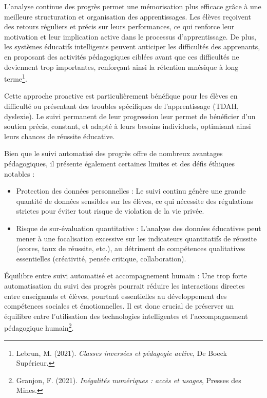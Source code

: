 \documentclass[11pt,a4paper]{report}
\begin{document}
L’analyse continue des progrès permet une mémorisation plus efficace grâce à une meilleure structuration et organisation des apprentissages. Les élèves reçoivent des retours réguliers et précis sur leurs performances, ce qui renforce leur motivation et leur implication active dans le processus d’apprentissage. De plus, les systèmes éducatifs intelligents peuvent anticiper les difficultés des apprenants, en proposant des activités pédagogiques ciblées avant que ces difficultés ne deviennent trop importantes, renforçant ainsi la rétention mnésique à long terme\footnote{Lebrun, M. (2021). \textit{Classes inversées et pédagogie active}, De Boeck Supérieur.}.

Cette approche proactive est particulièrement bénéfique pour les élèves en difficulté ou présentant des troubles spécifiques de l’apprentissage (TDAH, dyslexie). Le suivi permanent de leur progression leur permet de bénéficier d’un soutien précis, constant, et adapté à leurs besoins individuels, optimisant ainsi leurs chances de réussite éducative.

Bien que le suivi automatisé des progrès offre de nombreux avantages pédagogiques, il présente également certaines limites et des défis éthiques notables :

\begin{itemize}

    \item Protection des données personnelles : Le suivi continu génère une grande quantité de données sensibles sur les élèves, ce qui nécessite des régulations strictes pour éviter tout risque de violation de la vie privée.

    \item Risque de sur-évaluation quantitative : L’analyse des données éducatives peut mener à une focalisation excessive sur les indicateurs quantitatifs de réussite (scores, taux de réussite, etc.), au détriment de compétences qualitatives essentielles (créativité, pensée critique, collaboration).
 
\end{itemize}

Équilibre entre suivi automatisé et accompagnement humain : Une trop forte automatisation du suivi des progrès pourrait réduire les interactions directes entre enseignants et élèves, pourtant essentielles au développement des compétences sociales et émotionnelles. Il est donc crucial de préserver un équilibre entre l’utilisation des technologies intelligentes et l’accompagnement pédagogique humain\footnote{Granjon, F. (2021). \textit{Inégalités numériques : accès et usages}, Presses des Mines.}.
\end{document}
